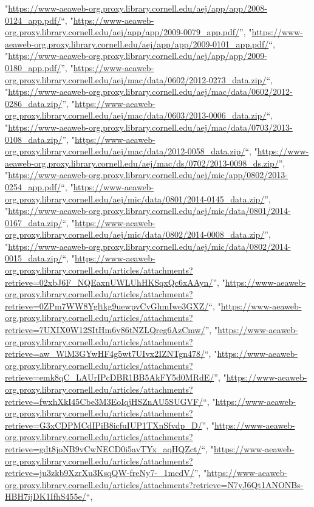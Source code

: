 \documentclass[]{article}
\begin{document}
\begin{itemize}
  "\url{https://www-aeaweb-org.proxy.library.cornell.edu/aej/app/app/2008-0124_app.pdf/}``,
  "\url{https://www-aeaweb-org.proxy.library.cornell.edu/aej/app/app/2009-0079_app.pdf/}'',
  "\url{https://www-aeaweb-org.proxy.library.cornell.edu/aej/app/app/2009-0101_app.pdf/}``,
  "\url{https://www-aeaweb-org.proxy.library.cornell.edu/aej/app/app/2009-0180_app.pdf/}'',
  "\url{https://www-aeaweb-org.proxy.library.cornell.edu/aej/mac/data/0602/2012-0273_data.zip/}``,
  "\url{https://www-aeaweb-org.proxy.library.cornell.edu/aej/mac/data/0602/2012-0286_data.zip/}'',
  "\url{https://www-aeaweb-org.proxy.library.cornell.edu/aej/mac/data/0603/2013-0006_data.zip/}``,
  "\url{https://www-aeaweb-org.proxy.library.cornell.edu/aej/mac/data/0703/2013-0108_data.zip/}'',
  "\url{https://www-aeaweb-org.proxy.library.cornell.edu/aej/mac/data/2012-0058_data.zip/}``,
  "\url{https://www-aeaweb-org.proxy.library.cornell.edu/aej/mac/ds/0702/2013-0098_ds.zip/}'',
  "\url{https://www-aeaweb-org.proxy.library.cornell.edu/aej/mic/app/0802/2013-0254_app.pdf/}``,
  "\url{https://www-aeaweb-org.proxy.library.cornell.edu/aej/mic/data/0801/2014-0145_data.zip/}'',
  "\url{https://www-aeaweb-org.proxy.library.cornell.edu/aej/mic/data/0801/2014-0167_data.zip/}``,
  "\url{https://www-aeaweb-org.proxy.library.cornell.edu/aej/mic/data/0802/2014-0008_data.zip/}'',
  "\url{https://www-aeaweb-org.proxy.library.cornell.edu/aej/mic/data/0802/2014-0015_data.zip/}``,
  "\url{https://www-aeaweb-org.proxy.library.cornell.edu/articles/attachments?retrieve=02xbJ6F_NQEaxnUWLUhHKSqxQc6xAAyn/}'',
  "\url{https://www-aeaweb-org.proxy.library.cornell.edu/articles/attachments?retrieve=0ZPm7WW8Ygltkg9uewpvCvGhmIwe3GXZ/}``,
  "\url{https://www-aeaweb-org.proxy.library.cornell.edu/articles/attachments?retrieve=7UXIX0W12SItHm6v86tNZLQreg6AzCmw/}'',
  "\url{https://www-aeaweb-org.proxy.library.cornell.edu/articles/attachments?retrieve=aw_WlM3GYwHF4g5wt7UIvx2IZNTgn478/}``,
  "\url{https://www-aeaweb-org.proxy.library.cornell.edu/articles/attachments?retrieve=emk8qC_LAUrIPcDBR1BB5AkFY5d0MRdE/}'',
  "\url{https://www-aeaweb-org.proxy.library.cornell.edu/articles/attachments?retrieve=fwxhXkI45Cbe3M3EoIqjHSZnAU5SUGVF/}``,
  "\url{https://www-aeaweb-org.proxy.library.cornell.edu/articles/attachments?retrieve=G3xCDPMCdIPiB8icfuIUP1TXnSfvdp_D/}'',
  "\url{https://www-aeaweb-org.proxy.library.cornell.edu/articles/attachments?retrieve=gdt8joNB9vCwNECD0i5avTYx_aqHQZct/}``,
  "\url{https://www-aeaweb-org.proxy.library.cornell.edu/articles/attachments?retrieve=ju3zkb9XzrXu3KsqQW-freNy7-_1mcdV/}'',
  "\url{https://www-aeaweb-org.proxy.library.cornell.edu/articles/attachments?retrieve=N7yJ6Qt1ANONBs-HBH7ijDK1IfhS455e/}``,

\end{itemize}
\end{document}
